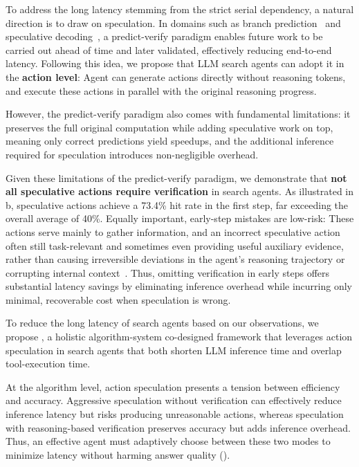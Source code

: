 To address the long latency stemming from the strict serial dependency, a natural direction is to draw on speculation.
In domains such as branch prediction~\cite{branchpredict} and speculative decoding~\cite{speculativedecoding,speculativesampling,eagle}, a predict-verify paradigm enables future work to be carried out ahead of time and later validated, effectively reducing end-to-end latency.
Following this idea, we propose that LLM search agents can adopt it in the \textbf{action level}: 
Agent can generate actions directly without reasoning tokens, and execute these actions in parallel with the original reasoning progress.

However, the predict-verify paradigm also comes with fundamental limitations: 
it preserves the full original computation while adding speculative work on top, meaning only correct predictions yield speedups, and the additional inference required for speculation introduces non-negligible overhead.

Given these limitations of the predict-verify paradigm, we demonstrate that \textbf{not all speculative actions require verification} in search agents.
As illustrated in b, speculative actions achieve a 73.4\% hit rate in the first step, far exceeding the overall average of 40\%.
Equally important, early-step mistakes are low-risk: 
These actions serve mainly to gather information, and an incorrect speculative action often still task-relevant and sometimes even providing useful auxiliary evidence, rather than causing irreversible deviations in the agent's reasoning trajectory or corrupting internal context~\cite{ircot}.
Thus, omitting verification in early steps offers substantial latency savings by eliminating inference overhead while incurring only minimal, recoverable cost when speculation is wrong.



To reduce the long latency of search agents based on our observations, we propose \system, a holistic algorithm-system co-designed framework that leverages action speculation in search agents that both shorten LLM inference time and overlap tool-execution time. 


At the algorithm level, action speculation presents a tension between efficiency and accuracy.
Aggressive speculation without verification can effectively reduce inference latency but risks producing unreasonable actions, whereas speculation with reasoning-based verification preserves accuracy but adds inference overhead.
Thus, an effective agent must adaptively choose between these two modes to minimize latency without harming answer quality ().

